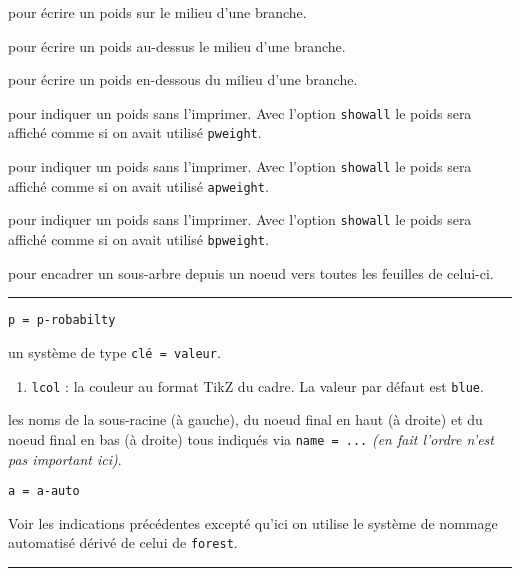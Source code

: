 \documentclass[12pt,a4paper]{article}
\theoremstyle{definition}
\newcommand\separation{
    \medskip
    \hfill\rule{0.5\textwidth}{0.75pt}\hfill
    \medskip
}
\newcommand\extraspace{
    \vspace{0.25em}
}
\newcommand\mwhyprefix[2]{%
    \texttt{#1 = #1-#2}%
}
\begin{document}
\extraspace

  pour écrire un poids sur le milieu d'une branche.

 pour écrire un poids au-dessus le milieu d'une branche.

 pour écrire un poids en-dessous du milieu d'une branche.

\extraspace

 pour indiquer un poids sans l'imprimer.
Avec l'option \verb#showall# le poids sera affiché comme si on avait utilisé \verb#pweight#.

 pour indiquer un poids sans l'imprimer.
Avec l'option \verb#showall# le poids sera affiché comme si on avait utilisé \verb#apweight#.

 pour indiquer un poids sans l'imprimer.
Avec l'option \verb#showall# le poids sera affiché comme si on avait utilisé \verb#bpweight#.

\extraspace

 pour encadrer un sous-arbre depuis un noeud vers toutes les feuilles de celui-ci.




\separation


 \hfill \mwhyprefix{p}{robabilty}

\IDoption{} un système de type \texttt{clé = valeur}.

\begin{enumerate}
    \item \verb#lcol# : la couleur au format TikZ du cadre. La valeur par défaut est \verb#blue#.
\end{enumerate}


 les noms de la sous-racine (à gauche), du noeud final en haut (à droite) et du noeud final en bas (à droite) tous indiqués via \verb#name = ...# \emph{(en fait l'ordre n'est pas important ici)}.


\bigskip


 \hfill \mwhyprefix{a}{auto}

\extraspace
\extraspace

Voir les indications précédentes excepté qu'ici on utilise le système de nommage automatisé dérivé de celui de \verb#forest#.




\separation


\end{document}

